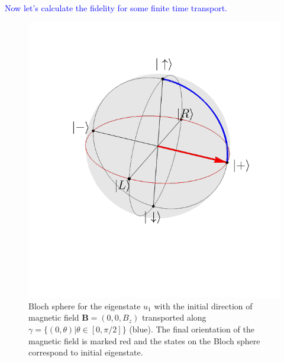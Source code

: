 \textcolor{blue}{Now let's calculate the fidelity for some finite time transport. }
\begin{figure}[h]
    \centering
    \includegraphics{../img/blochPiHalfTransport.pdf}
    \caption{Bloch sphere for the eigenstate $u_1$ with the initial direction of magnetic field $\mathbf B=(0,0,B_z)$ transported along $\gamma=\{(0,\theta)|\theta\in[0,\pi/2]\}$ (blue). The final orientation of the magnetic field is marked red and the states on the Bloch sphere correspond to initial eigenstate.}
    \label{fig:blochPiHalfTransport}
\end{figure}


